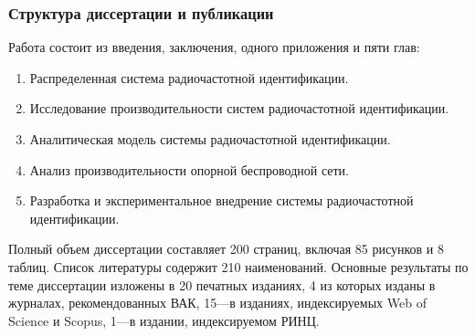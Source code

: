 \begin{frame}
    \frametitle{Структура диссертации и публикации}
    \small
    Работа состоит из введения, заключения, одного приложения и пяти глав:
    \begin{enumerate}
        \item Распределенная система радиочастотной идентификации.
        \item Исследование производительности систем радиочастотной идентификации.
        \item Аналитическая модель системы радиочастотной идентификации.
        \item Анализ производительности опорной беспроводной сети.
        \item Разработка и экспериментальное внедрение системы радиочастотной идентификации.
    \end{enumerate}

    Полный объем диссертации составляет 200 страниц, включая 85 рисунков и 8 таблиц. Список литературы содержит 210 наименований.
    \vfill
    Основные результаты по теме диссертации изложены в 20 печатных изданиях, 4 из которых изданы в журналах, рекомендованных ВАК, 15—в изданиях, индексируемых Web of Science и Scopus, 1—в издании, индексируемом РИНЦ.

\end{frame}
